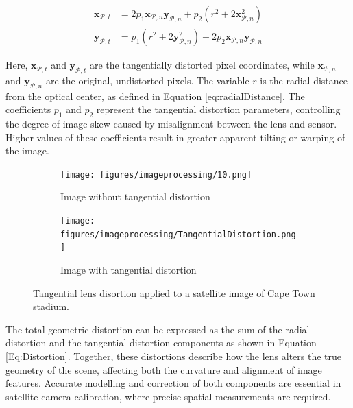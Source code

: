 \begin{equation}
    \begin{split}
    \mathbf{x}_{\mathcal{P},t}  &= 2p_1\mathbf{x}_{\mathcal{P},n} \mathbf{y}_{\mathcal{P},n}  + p_2(r^2 + 2\mathbf{x}_{\mathcal{P},n} ^2) \\
    \mathbf{y}_{\mathcal{P},t}  &= p_1(r^2 + 2\mathbf{y}_{\mathcal{P},n} ^2) + 2p_2\mathbf{x}_{\mathcal{P},n} \mathbf{y}_{\mathcal{P},n}
    \end{split}
\end{equation}

\noindent
Here, $\mathbf{x}_{\mathcal{P},t}$ and $\mathbf{y}_{\mathcal{P},t}$ are the tangentially distorted pixel coordinates, while $\mathbf{x}_{\mathcal{P},n}$ and $\mathbf{y}_{\mathcal{P},n}$ are the original, undistorted pixels. 
The variable $r$ is the radial distance from the optical center, as defined in Equation \ref{eq:radialDistance}. 
The coefficients $p_1$ and $p_2$ represent the tangential distortion parameters, controlling the degree of image skew caused by misalignment between the lens and sensor. 
Higher values of these coefficients result in greater apparent tilting or warping of the image.


\begin{figure}[H]
    \centering
    \begin{subfigure}[b]{0.48\linewidth}
        \centering
        \texttt{[image: figures/imageprocessing/10.png]}
        \caption{Image without tangential distortion}
        \label{fig:TD1}
    \end{subfigure}
    \hfill
    \begin{subfigure}[b]{0.48\linewidth}
        \centering
        \texttt{[image: figures/imageprocessing/TangentialDistortion.png]}
        \caption{Image with tangential distortion}
        \label{fig:TD2}
    \end{subfigure}
    \caption{Tangential lens disortion applied to a satellite image of Cape Town stadium.}
    \label{fig:TangentialDisortion}
\end{figure}


\noindent
The total geometric distortion can be expressed as the sum of the radial distortion and the tangential distortion components as shown in Equation \ref{Eq:Distortion}. Together, these
distortions describe how the lens alters the true geometry of the scene, affecting both the curvature and alignment of image features. Accurate modelling and correction of both 
components are essential in satellite camera calibration, where precise spatial measurements are required.


